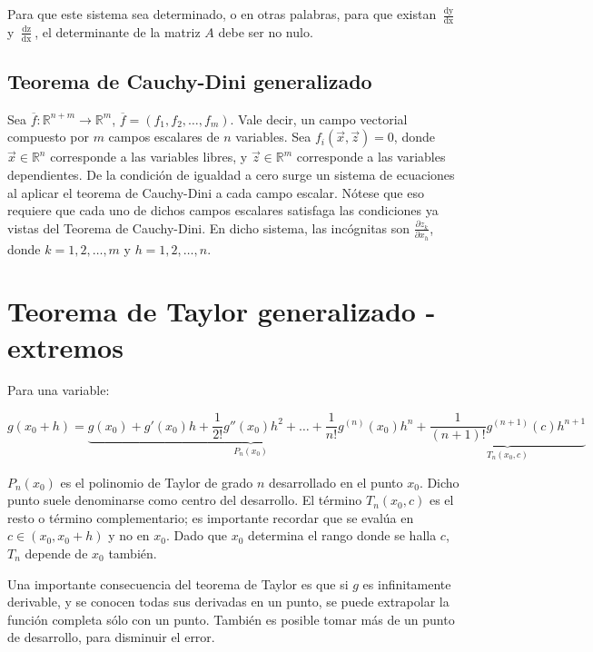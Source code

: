 \documentclass{article}
\renewcommand{\Bbb}{\mathbb}
\begin{document}
Para que este sistema sea determinado, o en otras palabras, para que existan $\frac{\mathop{dy}}{\mathop{dx}}$ y $\frac{\mathop{dz}}{\mathop{dx}}$, el determinante de la matriz $A$ debe ser no nulo.

\subsection{Teorema de Cauchy-Dini generalizado}

Sea $\overline{f}:\Bbb R^{n+m} \rightarrow \Bbb R^m$, $\overline{f} = (f_1, f_2, \ldots, f_m)$. Vale decir, un campo vectorial compuesto por $m$ campos escalares de $n$ variables. Sea $f_i(\overrightarrow{x}, \overrightarrow{z}) = 0$, donde $\overrightarrow{x} \in \Bbb R^n$ corresponde a las variables libres, y $\overrightarrow{z} \in \Bbb R^m$ corresponde a las variables dependientes. De la condición de igualdad a cero surge un sistema de ecuaciones al aplicar el teorema de Cauchy-Dini a cada campo escalar. Nótese que eso requiere que cada uno de dichos campos escalares satisfaga las condiciones ya vistas del Teorema de Cauchy-Dini. En dicho sistema, las incógnitas son $\frac{\partial z_k}{\partial x_h}$, donde $k = 1, 2, \ldots, m$ y $h = 1, 2, \ldots, n$.

\section{Teorema de Taylor generalizado - extremos}

Para una variable:

\begin{equation}
g(x_0 + h) = \underbrace{ g(x_0) + g'(x_0) h + \frac{1}{2!} g''(x_0) h^2 + \ldots + \frac{1}{n!} g^{(n)}(x_0) h^n }_{P_n(x_0)} +  \underbrace{ \frac{1}{(n+1)!} g^{(n+1)}(c) h^{n+1} }_{T_n(x_0, c)}
\end{equation}

$P_n(x_0)$ es el polinomio de Taylor de grado $n$ desarrollado en el punto $x_0$. Dicho punto suele denominarse como centro del desarrollo. El término $T_n(x_0, c)$ es el resto o término complementario; es importante recordar que se evalúa en $c \in (x_0, x_0 + h)$ y no en $x_0$. Dado que $x_0$ determina el rango donde se halla $c$, $T_n$ depende de $x_0$ también.

Una importante consecuencia del teorema de Taylor es que si $g$ es infinitamente derivable, y se conocen todas sus derivadas en un punto, se puede extrapolar la función completa sólo con un punto. También es posible tomar más de un punto de desarrollo, para disminuir el error.
\end{document}
